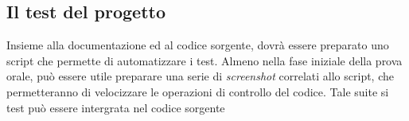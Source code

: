 \subsection{Il test del progetto}

Insieme alla documentazione ed al codice sorgente, dovrà essere preparato uno
script che permette di automatizzare i test. Almeno nella fase iniziale della
prova orale, può essere utile preparare una serie di \textit{screenshot}
correlati allo script, che permetteranno di velocizzare le operazioni di
controllo del codice. Tale suite si test può essere intergrata nel codice
sorgente 
